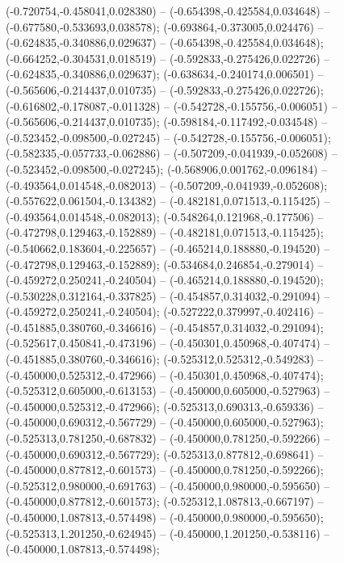  (-0.720754,-0.458041,0.028380) -- (-0.654398,-0.425584,0.034648) -- (-0.677580,-0.533693,0.038578);
 (-0.693864,-0.373005,0.024476) -- (-0.624835,-0.340886,0.029637) -- (-0.654398,-0.425584,0.034648);
 (-0.664252,-0.304531,0.018519) -- (-0.592833,-0.275426,0.022726) -- (-0.624835,-0.340886,0.029637);
 (-0.638634,-0.240174,0.006501) -- (-0.565606,-0.214437,0.010735) -- (-0.592833,-0.275426,0.022726);
 (-0.616802,-0.178087,-0.011328) -- (-0.542728,-0.155756,-0.006051) -- (-0.565606,-0.214437,0.010735);
 (-0.598184,-0.117492,-0.034548) -- (-0.523452,-0.098500,-0.027245) -- (-0.542728,-0.155756,-0.006051);
 (-0.582335,-0.057733,-0.062886) -- (-0.507209,-0.041939,-0.052608) -- (-0.523452,-0.098500,-0.027245);
 (-0.568906,0.001762,-0.096184) -- (-0.493564,0.014548,-0.082013) -- (-0.507209,-0.041939,-0.052608);
 (-0.557622,0.061504,-0.134382) -- (-0.482181,0.071513,-0.115425) -- (-0.493564,0.014548,-0.082013);
 (-0.548264,0.121968,-0.177506) -- (-0.472798,0.129463,-0.152889) -- (-0.482181,0.071513,-0.115425);
 (-0.540662,0.183604,-0.225657) -- (-0.465214,0.188880,-0.194520) -- (-0.472798,0.129463,-0.152889);
 (-0.534684,0.246854,-0.279014) -- (-0.459272,0.250241,-0.240504) -- (-0.465214,0.188880,-0.194520);
 (-0.530228,0.312164,-0.337825) -- (-0.454857,0.314032,-0.291094) -- (-0.459272,0.250241,-0.240504);
 (-0.527222,0.379997,-0.402416) -- (-0.451885,0.380760,-0.346616) -- (-0.454857,0.314032,-0.291094);
 (-0.525617,0.450841,-0.473196) -- (-0.450301,0.450968,-0.407474) -- (-0.451885,0.380760,-0.346616);
 (-0.525312,0.525312,-0.549283) -- (-0.450000,0.525312,-0.472966) -- (-0.450301,0.450968,-0.407474);
 (-0.525312,0.605000,-0.613153) -- (-0.450000,0.605000,-0.527963) -- (-0.450000,0.525312,-0.472966);
 (-0.525313,0.690313,-0.659336) -- (-0.450000,0.690312,-0.567729) -- (-0.450000,0.605000,-0.527963);
 (-0.525313,0.781250,-0.687832) -- (-0.450000,0.781250,-0.592266) -- (-0.450000,0.690312,-0.567729);
 (-0.525313,0.877812,-0.698641) -- (-0.450000,0.877812,-0.601573) -- (-0.450000,0.781250,-0.592266);
 (-0.525312,0.980000,-0.691763) -- (-0.450000,0.980000,-0.595650) -- (-0.450000,0.877812,-0.601573);
 (-0.525312,1.087813,-0.667197) -- (-0.450000,1.087813,-0.574498) -- (-0.450000,0.980000,-0.595650);
 (-0.525313,1.201250,-0.624945) -- (-0.450000,1.201250,-0.538116) -- (-0.450000,1.087813,-0.574498);
